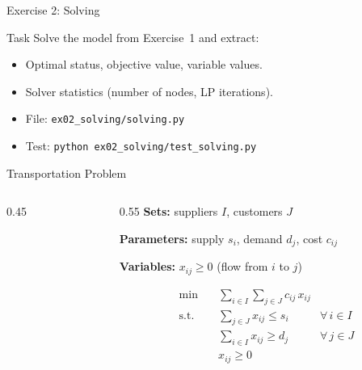 \documentclass[aspectratio=169,10pt]{beamer}
\begin{document}
\begin{frame}{Exercise 2: Solving}
\begin{block}{Task}
Solve the model from Exercise~1 and extract:
\begin{itemize}
  \item Optimal status, objective value, variable values.
  \item Solver statistics (number of nodes, LP iterations).
\end{itemize}
\end{block}
\begin{itemize}
  \item File: \texttt{ex02\_solving/solving.py}
  \item Test: \texttt{python ex02\_solving/test\_solving.py}
\end{itemize}
\end{frame}

\begin{frame}{Transportation Problem}
\begin{columns}[T]
\begin{column}{0.45\textwidth}
\begin{center}
\end{center}
\end{column}
\begin{column}{0.55\textwidth}
\textbf{Sets:} suppliers $I$, customers $J$

\textbf{Parameters:} supply $s_i$, demand $d_j$, cost $c_{ij}$

\textbf{Variables:} $x_{ij} \ge 0$ (flow from $i$ to $j$)

\begin{align*}
  \min \quad & \sum_{i \in I}\sum_{j \in J} c_{ij}\, x_{ij} \\
  \text{s.t.} \quad
    & \sum_{j \in J} x_{ij} \le s_i  & \forall\, i \in I \\
    & \sum_{i \in I} x_{ij} \ge d_j  & \forall\, j \in J \\
    & x_{ij} \ge 0
\end{align*}
\end{column}
\end{columns}
\end{frame}
\end{document}
